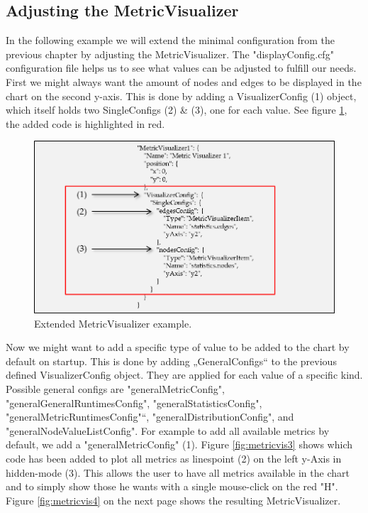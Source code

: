 \subsection{Adjusting the MetricVisualizer}
In the following example we will extend the minimal configuration from the previous chapter by adjusting the MetricVisualizer. The "displayConfig.cfg" configuration file helps us to see what values can be adjusted to fulfill our needs. First we might always want the amount of nodes and edges to be displayed in the chart on the second y-axis. This is done by adding a VisualizerConfig (1) object, which itself holds two SingleConfigs (2) \& (3), one for each value. See figure \ref{fig:metricvis2}, the added code is highlighted in red.

\begin{figure} [h]
\centering
\includegraphics [scale=1] {images/metricvis2}
\caption{Extended MetricVisualizer example.}
\label{fig:metricvis2}
\end{figure}

Now we might want to add a specific type of value to be added to the chart by default on startup. This is done by adding „GeneralConfigs“ to the previous defined VisualizerConfig object. They are applied for each value of a specific kind. Possible general configs are "generalMetricConfig", "generalGeneralRuntimesConfig", "generalStatisticsConfig", "generalMetricRuntimesConfig"“, "generalDistributionConfig", and "generalNodeValueListConfig". For example to add all available metrics by default, we add a "generalMetricConfig" (1). Figure \ref{fig:metricvis3} shows which code has been added to plot all metrics as linespoint (2) on the left y-Axis in hidden-mode (3). This allows the user to have all metrics available in the chart and to simply show those he wants with a single mouse-click on the red "H". Figure \ref{fig:metricvis4} on the next page shows the resulting MetricVisualizer.

